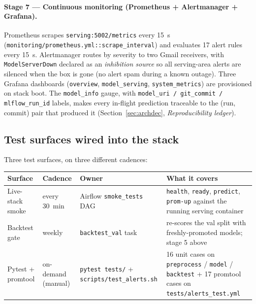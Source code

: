 \documentclass[11pt,a4paper]{article}
\begin{document}
\paragraph{Stage 7 --- Continuous monitoring (Prometheus + Alertmanager + Grafana).}
Prometheus scrapes \texttt{serving:5002/metrics} every 15~s (\texttt{monitoring/prometheus.yml::scrape\_interval}) and evaluates 17 alert rules every 15~s. Alertmanager routes by severity to two Gmail receivers, with \texttt{ModelServerDown} declared as an \emph{inhibition source} so all serving-area alerts are silenced when the box is gone (no alert spam during a known outage). Three Grafana dashboards (\texttt{overview}, \texttt{model\_serving}, \texttt{system\_metrics}) are provisioned on stack boot. The \texttt{model\_info} gauge, with \texttt{model\_uri / git\_commit / mlflow\_run\_id} labels, makes every in-flight prediction traceable to the (run, commit) pair that produced it (Section~\ref{sec:archdec}, \emph{Reproducibility ledger}).

\subsection{Test surfaces wired into the stack}\label{sec:cicd-tests}

Three test surfaces, on three different cadences:

\begin{tabularx}{\linewidth}{@{}lllX@{}}
\toprule
\textbf{Surface} & \textbf{Cadence} & \textbf{Owner} & \textbf{What it covers} \\
\midrule
Live-stack smoke   & every 30~min        & Airflow \texttt{smoke\_tests} DAG       & \texttt{health}, \texttt{ready}, \texttt{predict}, \texttt{prom-up} against the running serving container \\
Backtest gate      & weekly              & \texttt{backtest\_val} task             & re-scores the val split with freshly-promoted models; stage 5 above \\
Pytest + promtool  & on-demand (manual)  & \texttt{pytest tests/} + \texttt{scripts/test\_alerts.sh} & 16 unit cases on \texttt{preprocess} / \texttt{model} / \texttt{backtest} + 17 promtool cases on \texttt{tests/alerts\_test.yml} \\
\bottomrule
\end{tabularx}
\end{document}
